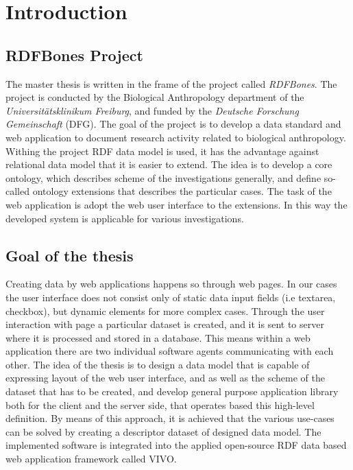\chapter{Introduction}


\section{RDFBones Project}

The master thesis is written in the frame of the project called \textit{RDFBones}. The project is conducted by the Biological Anthropology department of the \textit{Universitätsklinikum Freiburg}, and funded by the \textit{Deutsche Forschung Gemeinschaft} (DFG).  The goal of the project is to develop a data standard and web application to document research activity related to biological anthropology. Withing the project RDF data model is used, it has the advantage against relational data model that it is easier to extend. The idea is to develop a core ontology, which describes scheme of the investigations generally, and define so-called ontology extensions that describes the particular cases. The task of the web application is adopt the web user interface to the extensions. In this way the developed system is applicable for various investigations. \cite{infrastructure}

\section{Goal of the thesis}

Creating data by web applications happens so through web pages. In our cases the user interface does not consist only of static data input fields (i.e textarea, checkbox), but dynamic elements for more complex cases. Through the user interaction with page a particular dataset is created, and it is sent to server where it is processed and stored in a database. This means within a web application there are two individual software agents communicating with each other. The idea of the thesis is to design a data model that is capable of expressing layout of the web user interface, and as well as the scheme of the dataset that has to be created, and develop general purpose application library both for the client and the server side, that operates based this high-level definition. By means of this approach, it is achieved that the various use-cases can be solved by creating a descriptor dataset of designed data model. The implemented software is integrated into the applied open-source RDF data based web application framework called VIVO.


